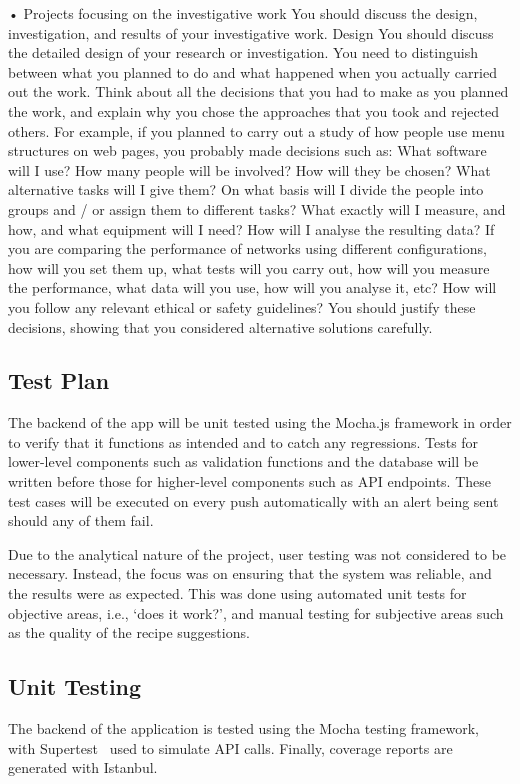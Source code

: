 {    •	Projects focusing on the investigative work
    You should discuss the design, investigation, and results of your investigative work.
    Design
    You should discuss the detailed design of your research or investigation. You need to distinguish between what you planned to do and what happened when you actually
    carried out the work. Think about all the decisions that you had to make as you planned the work, and explain why you chose the approaches that you took and rejected others.
    For example, if you planned to carry out a study of how people use menu structures on web pages, you probably made decisions such as: What software will I use? How many
    people will be involved? How will they be chosen? What alternative tasks will I give them? On what basis will I divide the people into groups and / or assign them
    to different tasks? What exactly will I measure, and how, and what equipment will I need? How will I analyse the resulting data? If you are comparing the performance
    of networks using different configurations, how will you set them up, what tests will you carry out, how will you measure the performance, what data will you use, how
    will you analyse it, etc? How will you follow any relevant ethical or safety guidelines? You should justify these decisions, showing that you considered alternative
    solutions carefully.
}


\subsection{Test Plan}
The backend of the app will be unit tested using the Mocha.js framework in order
to verify that it functions as intended and to catch any regressions. Tests for lower-level components
such as validation functions and the database will be written before those for higher-level
components such as API endpoints. These test cases will be executed on every push automatically
with an alert being sent should any of them fail.

Due to the analytical nature of the project, user testing was not considered to be necessary. Instead,
the focus was on ensuring that the system was reliable, and the results were as expected. This was done
using automated unit tests for objective areas, i.e., \enquote*{does it work?}, and manual testing
for subjective areas such as the quality of the recipe suggestions.

\subsection{Unit Testing}
The backend of the application is tested using the Mocha testing framework,~\cite{noauthor_mocha_nodate} with Supertest~\cite{noauthor_ladjssupertest_2024}
used to simulate API calls. Finally, coverage reports are generated with Istanbul.~\cite{noauthor_istanbul_nodate}

